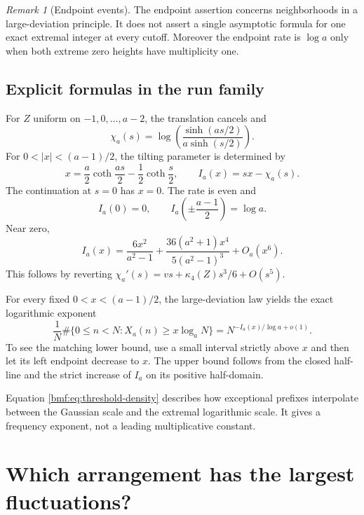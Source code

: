 \documentclass[11pt]{article}
\numberwithin{equation}{section}
\theoremstyle{definition}
\theoremstyle{remark}
\newtheorem{remark}[theorem]{Remark}
\begin{document}
\begin{remark}[Endpoint events]
The endpoint assertion concerns neighborhoods in a large-deviation
principle. It does not assert a single asymptotic formula for one
exact extremal integer at every cutoff. Moreover the endpoint
rate is $\log a$ only when both extreme zero heights have
multiplicity one.
\end{remark}

\subsection{Explicit formulas in the run family}

For $Z$ uniform on $-1,0,\ldots,a-2$, the translation cancels and
\begin{equation}\label{bmf:eq:run-pressure}
 \chi_a(s)=\log\left(\frac{\sinh(as/2)}{a\sinh(s/2)}\right).
\end{equation}
For $0<|x|<(a-1)/2$, the tilting parameter is determined by
\begin{equation}\label{bmf:eq:saddle}
 x=\frac a2\coth\frac{as}{2}-\frac12\coth\frac{s}{2},
 \qquad I_a(x)=sx-\chi_a(s).
\end{equation}
The continuation at $s=0$ has $x=0$. The rate is even and
\[
 I_a(0)=0,\qquad I_a\!\left(\pm\frac{a-1}{2}\right)=\log a.
\]
Near zero,
\begin{equation}\label{bmf:eq:rate-near0}
 I_a(x)=\frac{6x^2}{a^2-1}
       +\frac{36(a^2+1)x^4}{5(a^2-1)^3}+O_a(x^6).
\end{equation}
This follows by reverting
$\chi_a'(s)=vs+\kappa_4(Z)s^3/6+O(s^5)$.

For every fixed $0<x<(a-1)/2$, the large-deviation law yields
the exact logarithmic exponent
\begin{equation}\label{bmf:eq:threshold-density}
 \frac1N\#\{0\leq n<N:X_a(n)\geq x\log_a N\}
   =N^{-I_a(x)/\log a+o(1)}.
\end{equation}
To see the matching lower bound, use a small interval strictly
above $x$ and then let its left endpoint decrease to $x$.
The upper bound follows from the closed half-line and the
strict increase of $I_a$ on its positive half-domain.

Equation \eqref{bmf:eq:threshold-density} describes how exceptional
prefixes interpolate between the Gaussian scale and the extremal
logarithmic scale. It gives a frequency exponent, not a leading
multiplicative constant.

\section{Which arrangement has the largest fluctuations?}\label{bmf:sec:arrangements}
\end{document}
